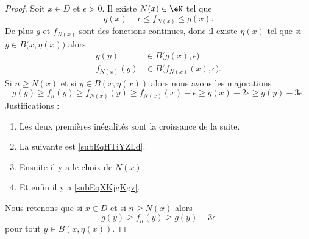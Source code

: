 \begin{proof}
    Soit \( x\in D\) et \( \epsilon>0\). Il existe \( N(x)\in \eN\) tel que
    \begin{equation}
        g(x)-\epsilon\leq f_{N(x)}\leq g(x).
    \end{equation}
    De plus \( g\) et \( f_{N(x)}\) sont des fonctions continues, donc il existe \( \eta(x)\) tel que si \( y\in B\big( x,\eta(x) \big)\) alors
    \begin{subequations}
        \begin{align}
            g(y)&\in B\big( g(x),\epsilon \big) \label{subEqXKjgKgv}\\
            f_{N(x)}(y)&\in B\big( f_{N(x)}(x),\epsilon \big)   \label{subEqHTiYZLd}.
        \end{align}
    \end{subequations}
    Si \( n\geq N(x)\) et si \( y\in B(x,\eta(x))\) alors nous avons les majorations
    \begin{equation}
            g(y)\geq f_n(y)
            \geq f_{N(x)}(y)
            \geq f_{N(x)}(x)-\epsilon
            \geq g(x)-2\epsilon
            \geq g(y)-3\epsilon.
    \end{equation}
    Justifications :
    \begin{multicols}{2}
        \begin{enumerate}
            \item
                Les deux premières inégalités sont la croissance de la suite.
            \item
                La suivante est \eqref{subEqHTiYZLd}.
            \item
                Ensuite il y a le choix de \( N(x)\).
            \item
                Et enfin il y a \eqref{subEqXKjgKgv}.
        \end{enumerate}
    \end{multicols}
    Nous retenons que si \( x\in D\) et si \( n\geq N(x)\) alors
    \begin{equation}    \label{EqJCMktdj}
        g(y)\geq f_n(y)\geq g(y)-3\epsilon
    \end{equation}
    pour tout \( y\in B(x,\eta(x))\).


\end{proof}

